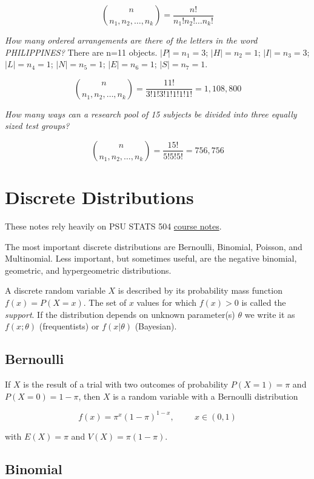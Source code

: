 \documentclass[
]{book}
\begin{document}
\[{n \choose {n_1, n_2, \dots, n_k}} = \frac{n!}{n_{1}! n_{2}! \dots n_{k}!}\]

\emph{How many ordered arrangements are there of the letters in the word PHILIPPINES?} There are n=11 objects. \(|P|=n_1=3\); \(|H|=n_2=1\); \(|I|=n_3=3\); \(|L|=n_4=1\); \(|N|=n_5=1\); \(|E|=n_6=1\); \(|S|=n_7=1\).

\[{n \choose {n_1, n_2, \dots, n_k}} = \frac{11!}{3! 1! 3! 1! 1! 1! 1!} = 1,108,800\]

\emph{How many ways can a research pool of 15 subjects be divided into three equally sized test groups?}

\[{n \choose {n_1, n_2, \dots, n_k}} = \frac{15!}{5! 5! 5!} = 756,756\]

\hypertarget{discrete-distributions}{%
\section{Discrete Distributions}\label{discrete-distributions}}

These notes rely heavily on PSU STATS 504 \href{https://online.stat.psu.edu/stat504/node/209/}{course notes}.

The most important discrete distributions are Bernoulli, Binomial, Poisson, and Multinomial. Less important, but sometimes useful, are the negative binomial, geometric, and hypergeometric distributions.

A discrete random variable \(X\) is described by its probability mass function \(f(x) = P(X = x)\). The set of \(x\) values for which \(f(x) > 0\) is called the \emph{support}. If the distribution depends on unknown parameter(s) \(\theta\) we write it as \(f(x; \theta)\) (frequentists) or \(f(x | \theta)\) (Bayesian).

\hypertarget{bernoulli}{%
\subsection{Bernoulli}\label{bernoulli}}

If \(X\) is the result of a trial with two outcomes of probability \(P(X = 1) = \pi\) and \(P(X = 0) = 1 - \pi\), then \(X\) is a random variable with a Bernoulli distribution

\[f(x) = \pi^x (1 - \pi)^{1 - x}, \hspace{1cm} x \in (0, 1)\]

with \(E(X) = \pi\) and \(V(X) = \pi(1 - \pi)\).

\hypertarget{binomial}{%
\subsection{Binomial}\label{binomial}}
\end{document}
